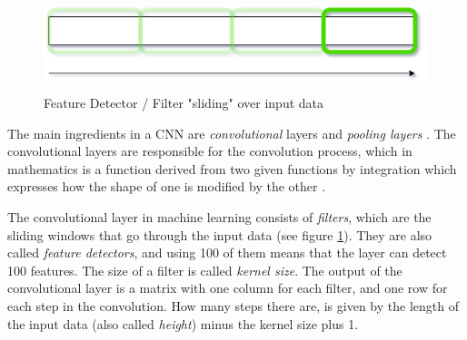 \begin{figure}[h]
\begin{center}
    \includegraphics[height=2.5cm]{img/feature_detector.png}
    \caption{Feature Detector / Filter "sliding" over input data}
    \label{figure:feature_detector}
\end{center}
\end{figure}

\noindent The main ingredients in a CNN are \textit{convolutional} layers and \textit{pooling layers} \cite{deep_learning}. The convolutional layers are responsible for the convolution process, which in mathematics is a function derived from two given functions by integration which expresses how the shape of one is modified by the other \cite{convolution_definition}. 

The convolutional layer in machine learning consists of \textit{filters}, which are the sliding windows that go through the input data (see figure \ref{figure:feature_detector}). They are also called \textit{feature detectors}, and using 100 of them means that the layer can detect 100 features. The size of a filter is called \textit{kernel size}. The output of the convolutional layer is a matrix with one column for each filter, and one row for each step in the convolution. How many steps there are, is given by the length of the input data (also called \textit{height}) minus the kernel size plus 1.

